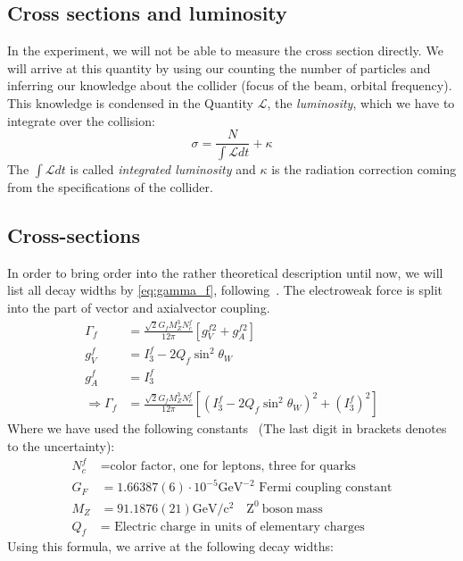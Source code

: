 \subsection{Cross sections and luminosity}
In the experiment, we will not be able to measure the cross section directly. We will arrive at this quantity by using our
counting the number of particles and inferring our knowledge about the collider (focus of the beam, orbital frequency). This
knowledge is condensed in the Quantity $\mathcal{L}$, the \textit{luminosity}, which we have to integrate over the collision:
\begin{equation}
    \sigma = \frac{N}{\int \mathcal{L} dt} + \kappa
\end{equation}
The $\int \mathcal{L} dt$ is called \textit{integrated luminosity} and $\kappa$ is the radiation correction coming from the
specifications of the collider.
\subsection{Cross-sections}
\label{sub:cross_sections}
In order to bring order into the rather theoretical description until now, we will list all decay widths by \eqref{eq:gamma_f},
following~\cite{ver}.
The electroweak force is split into the part of vector and axialvector coupling. 
\begin{align*}
    \Gamma_f &= \frac{\sqrt{2} G_f M_Z^3 N_c^f}{12 \pi} \left[ g_V^{f2} + g_A^{f2} \right] \\
       g_V^f &= I_3^f - 2 Q_f \sin^2 \theta_W \\
       g_A^f &= I_3^f \\
\Rightarrow \Gamma_f &= \frac{\sqrt{2} G_f M_Z^3 N_c^f}{12 \pi} \left[ (I_3^f - 2 Q_f \sin^2 \theta_W)^2 + (I_3^f)^2  \right] 
\end{align*}
Where we have used the following constants~\cite{pdg} (The last digit in brackets denotes to the uncertainty):
\begin{align*}
\label{eq:consts}
    N_c^f &= \text{color factor, one for leptons, three for quarks}  \\
    G_F &= 1.66387(6) \cdot 10^{-5} \mathrm{GeV^{-2}} \text{ Fermi coupling constant} \\
    M_Z &= 91.1876(21) \mathrm{GeV /c^{2}} \quad \mathrm{Z^0 \: boson \: mass} \\
    Q_f &= \text{ Electric charge in units of elementary charges}
\end{align*}
Using this formula, we arrive at the following decay widths:

